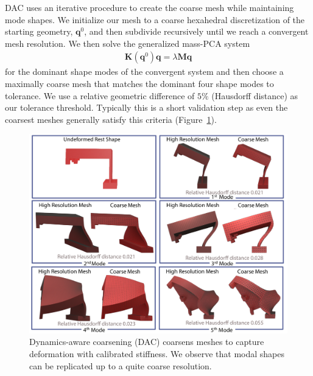 DAC uses an iterative procedure to create the coarse mesh while maintaining mode shapes.
We initialize our mesh to a coarse hexahedral discretization of the starting geometry, $\mathbf{q}^0$, and then subdivide recursively until we reach a convergent mesh resolution.
We then solve the generalized mass-PCA system 
\begin{align}
\mathbf{K}(\mathbf{q}^0) \mathbf{q} = \lambda \mathbf{M}\mathbf{q}
\end{align}
for the dominant shape modes of the convergent system and then 
choose a maximally coarse mesh that matches the dominant four shape modes to tolerance. We use a relative geometric difference of $5\%$ (Hausdorff distance) as our tolerance threshold. Typically this is a short validation step as even the coarsest meshes generally satisfy this criteria (Figure~\ref{fig:defo_and_frequency_match}).
\begin{figure}[ht]
	\centering
	\includegraphics[width=0.5\columnwidth]{images/modeFit3.pdf}
	\caption{Dynamics-aware coarsening (DAC) coarsens meshes to capture deformation with calibrated stiffness. We observe that modal shapes can be replicated up to a quite coarse resolution.}
	\label{fig:defo_and_frequency_match}
\end{figure}


